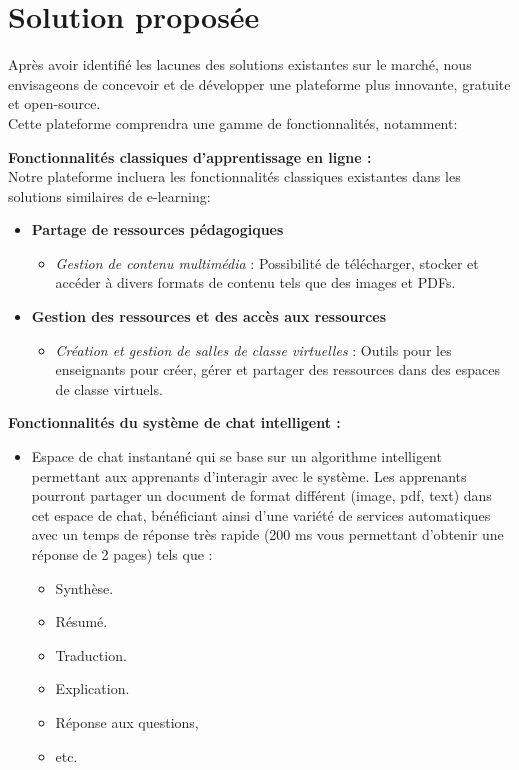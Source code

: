 \section{Solution proposée}
Après avoir identifié les lacunes des solutions existantes sur le marché, nous envisageons de concevoir et de développer une plateforme plus innovante, gratuite et open-source.\\
Cette plateforme comprendra une gamme de fonctionnalités, notamment:

\vspace{0.5em}
\noindent \textbf{Fonctionnalités classiques d'apprentissage en ligne :}\\
Notre plateforme incluera les fonctionnalités classiques existantes dans les solutions similaires de e-learning:
\begin{itemize}[itemsep=2pt, parsep=2pt]
    \item \textbf{Partage de ressources pédagogiques}
    \begin{itemize}
        \item \textit{Gestion de contenu multimédia} : Possibilité de télécharger, stocker et accéder à divers formats de contenu tels que des images et PDFs.
    \end{itemize}
    \item \textbf{Gestion des ressources et des accès aux ressources}
    \begin{itemize}
        \item \textit{Création et gestion de salles de classe virtuelles} : Outils pour les enseignants pour créer, gérer et partager des ressources dans des espaces de classe virtuels.
    \end{itemize}   
\end{itemize}
\vspace{0.5em}
\textbf{Fonctionnalités du système de chat intelligent :}
\begin{itemize}
    \item Espace de chat instantané qui se base sur un algorithme intelligent permettant aux apprenants d'interagir avec le système. Les apprenants pourront partager un document de format différent (image, pdf, text) dans cet espace de chat, bénéficiant ainsi d'une variété de services automatiques avec un temps de réponse très rapide (200 ms vous permettant d'obtenir une réponse de 2 pages) tels que :
    \begin{itemize}[itemsep=2pt, parsep=2pt]
        \item Synthèse.
        \item Résumé.
        \item Traduction.
        \item Explication.
        \item Réponse aux questions, 
        \item etc.
    \end{itemize}
\end{itemize}

